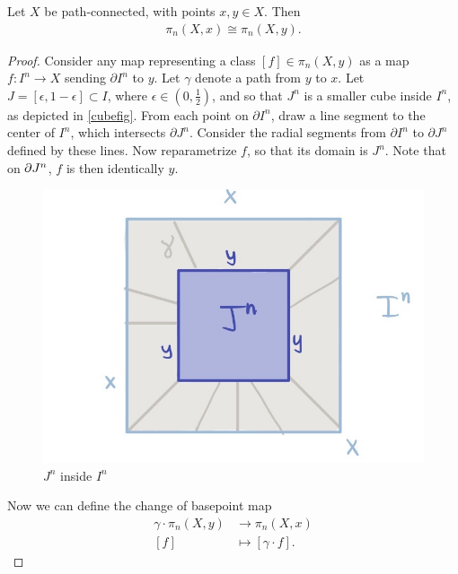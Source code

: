\documentclass{article}[11pt]
\begin{document}
\begin{proposition}\label{basepoint_dependence} Let $X$ be path-connected, with points $x,y \in X$. Then
\begin{align*}
	\pi_n(X,x) \cong \pi_n(X,y).
\end{align*}
\end{proposition}
\begin{proof} Consider any map representing a class $[f] \in \pi_n(X,y)$ as a map $f \colon I^n \to X$ sending $\partial I^n$ to $y$. Let $\gamma$ denote a path from $y$ to $x$. Let $J=[\epsilon, 1-\epsilon]\subset I$, where $\epsilon\in(0,\frac{1}{2})$, and so that $J^n$ is a smaller cube inside $I^n$, as depicted in \autoref{cubefig}. From each point on $\partial I^n$, draw a line segment to the center of $I^n$, which intersects $\partial J^n$. Consider the radial segments from $\partial I^n$ to $\partial J^n$ defined by these lines. Now reparametrize $f$, so that its domain is $J^n$. Note that on $\partial J^n$, $f$ is then identically $y$.

\begin{figure}[h]
  \includegraphics[scale=.23]{pics/cubefig.png}
  \centering
  \caption{$J^n$ inside $I^n$}
  \label{cubefig}
\end{figure}

Now we can define the change of basepoint map
\begin{align*}
\gamma\cdot	\pi_n(X,y) &\to \pi_n(X,x) \\
	[f] &\mapsto [\gamma \cdot f ].
\end{align*}


\end{proof}
\end{document}
